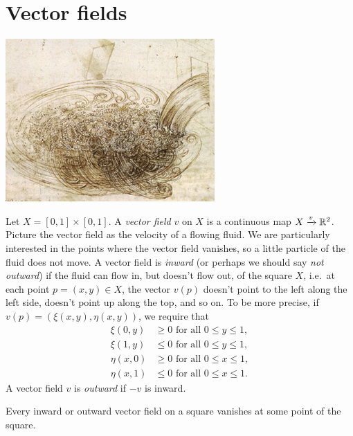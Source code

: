 \section{Vector fields}
\begin{center}
\includegraphics[width=8cm]{AN-Leonardo-Water-Study-723926.jpg}
\end{center}
Let \(X=[0,1]\times [0,1]\).
A \emph{vector field} \(v\) on \(X\) is a continuous map \(X\xrightarrow{v}\mathbb{R}^{2}\).
Picture the vector field as the velocity of a flowing fluid.
We are particularly interested in the points where the vector field vanishes, so a little particle of the fluid does not move.
A vector field is \emph{inward} (or perhaps we should say \emph{not outward}) if the fluid can flow in, but doesn't flow out, of the square \(X\), i.e.\ at each point \(p=(x,y)\in X\), the vector \(v(p)\) doesn't point to the left along the left side, doesn't point up along the top, and so on.
To be more precise, if \(v(p)=(\xi(x,y),\eta(x,y))\), we require that
\begin{align*}
\xi(0,y)&\ge 0 \text{ for all } 0\le y\le 1,\\
\xi(1,y)&\le 0 \text{ for all } 0\le y\le 1,\\
\eta(x,0)&\ge 0 \text{ for all } 0\le x\le 1,\\
\eta(x,1)&\le 0 \text{ for all } 0\le x\le 1.
\end{align*}
A vector field \(v\) is \emph{outward} if \(-v\) is inward.
\begin{theorem}
Every inward or outward vector field on a square vanishes at some point of the square.
\end{theorem}
